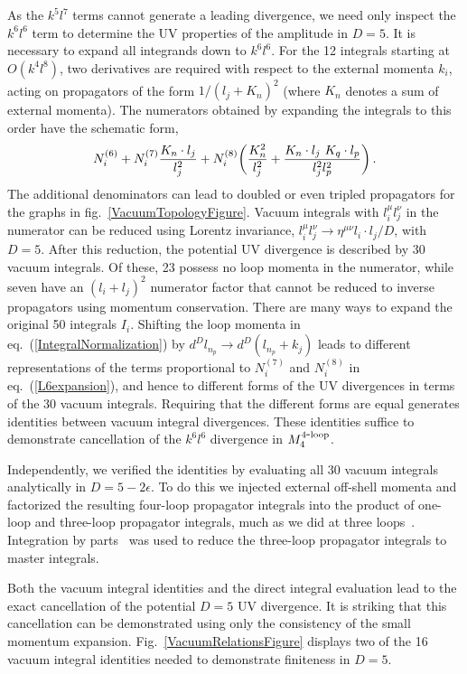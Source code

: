 \documentclass[aps,prl,twocolumn,groupedaddress,draft,showpacs,nofootinbib]{revtex4}
\def\fig#1{fig.~{\ref{#1}}}
\def\Fig#1{Fig.~{\ref{#1}}}
\def\eps{\epsilon}
\def\eqn#1{eq.~(\ref{#1})}
\def\fourloop{{\rm 4\hbox{-}loop}}
\begin{document}
As the $k^5 l^7$ terms cannot generate a leading divergence, 
we need only inspect the $k^6 l^6$ term to determine the 
UV properties of the amplitude in $D=5$.
It is necessary
to expand all integrands down to $k^6 l^6$.  For the 12
integrals starting at $O(k^4 l^8)$, two derivatives are required
with respect to the external momenta $k_i$, acting on propagators of
the form $1/(l_j+K_n)^2$ (where $K_n$ denotes a sum of external
momenta).  The numerators obtained by expanding the integrals to this
order have the schematic form,
%
\begin{equation}
N_i^{(6)} + N_i^{(7)} { K_n\cdot l_j \over l_j^2}
+ N_i^{(8)}\biggl( 
{ K_n^2 \over l_j^2}
+ { K_n\cdot l_j \,\, K_q\cdot l_p \over l_j^2 l_p^2 } \biggr) \,.
\label{L6expansion}
\end{equation}
%
The additional denominators can lead to doubled or even tripled
propagators for the graphs in \fig{VacuumTopologyFigure}.
Vacuum integrals with $l^\mu_i l^\nu_j$ in the numerator
can be reduced using Lorentz invariance, 
$l^\mu_i l^\nu_j \rightarrow \eta^{\mu \nu} l_i \cdot l_j/D $, with
$D=5$.  After this reduction, the potential UV divergence is
described by 30 vacuum integrals.
Of these, 23 possess no loop momenta in the numerator, while seven
have an $(l_i+l_j)^2$ numerator factor that cannot be reduced to
inverse propagators using momentum conservation.  There are many ways
to expand the original 50 integrals $I_i$.  Shifting the loop momenta
in \eqn{IntegralNormalization} by
$d^Dl_{n_p} \rightarrow d^D(l_{n_p}+k_j)$
leads to different representations of the terms proportional to
$N_i^{(7)}$ and $N_i^{(8)}$ in \eqn{L6expansion}, and hence to
different forms of the UV divergences in terms of the 30 vacuum
integrals.  Requiring that the different forms are equal generates
identities between vacuum integral divergences.  These identities
suffice to demonstrate cancellation of the $k^6l^6$ divergence in
$M_4^\fourloop$.

Independently, we verified the identities by evaluating all
30 vacuum integrals analytically in $D=5-2\eps$.  To do this we
injected external off-shell momenta and factorized the resulting four-loop
propagator integrals into the product of one-loop and three-loop
propagator integrals, much as we did at three
loops~\cite{CompactThree}.  Integration by parts~\cite{IBP} was used
to reduce the three-loop propagator integrals to master integrals.

Both the vacuum integral identities and the direct integral evaluation
lead to the exact cancellation of the potential $D = 5$ UV divergence.
It is striking that this cancellation can be demonstrated using only
the consistency of the small momentum expansion.
\Fig{VacuumRelationsFigure} displays two of the 16 vacuum integral
identities needed to demonstrate 
finiteness in $D=5$.  
\end{document}
